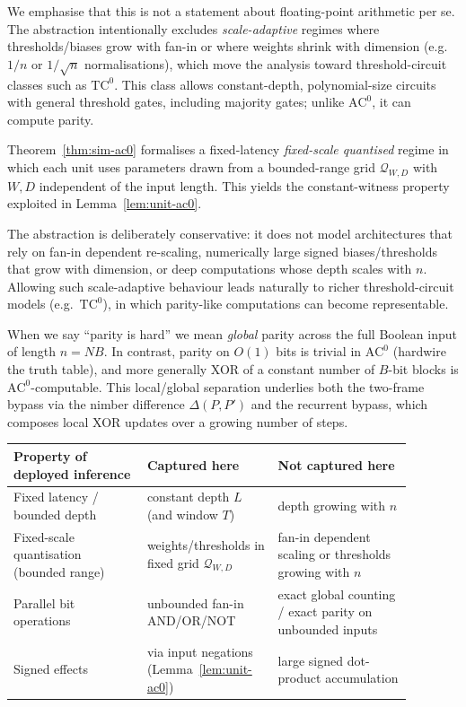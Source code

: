 \documentclass[twoside,11pt]{article}
\newcommand{\AC}{\mathrm{AC}}
\newcommand{\TC}{\mathrm{TC}}
\newcommand{\Qset}{\mathcal{Q}}
\numberwithin{theorem}{section}
\numberwithin{equation}{section}
\begin{document}
We emphasise that this is not a statement about floating-point arithmetic per se.
The abstraction intentionally excludes \emph{scale-adaptive} regimes where thresholds/biases grow with fan-in or where weights shrink with dimension (e.g.\ $1/n$ or $1/\sqrt{n}$ normalisations), which move the analysis toward threshold-circuit classes such as $\TC^0$. This class allows constant-depth, polynomial-size circuits with general threshold gates, including majority gates; unlike $\AC^0$, it can compute parity.
\begin{remark}[Scope of the $\AC^0$ abstraction]
\label{rem:ac0-scope}
Theorem~\ref{thm:sim-ac0} formalises a fixed-latency \emph{fixed-scale quantised} regime in which each unit uses parameters drawn from a bounded-range grid $\Qset_{W,D}$ with $W,D$ independent of the input length.
This yields the constant-witness property exploited in Lemma~\ref{lem:unit-ac0}.

The abstraction is deliberately conservative: it does not model architectures that rely on fan-in dependent re-scaling, numerically large signed biases/thresholds that grow with dimension, or deep computations whose depth scales with $n$.
Allowing such scale-adaptive behaviour leads naturally to richer threshold-circuit models (e.g.\ $\TC^0$), in which parity-like computations can become representable.
\end{remark}

\begin{remark}
\label{rem:local-vs-global-parity}
When we say ``parity is hard'' we mean \emph{global} parity across the full Boolean input of length $n=NB$.
In contrast, parity on $O(1)$ bits is trivial in $\AC^0$ (hardwire the truth table), and more generally XOR of a constant number of $B$-bit blocks is $\AC^0$-computable.
This local/global separation underlies both the two-frame bypass via the nimber difference $\Delta(P,P')$ and the recurrent bypass, which composes local XOR updates over a growing number of steps.
\end{remark}

\begin{center}
\begin{tabular}{|>{\raggedright\arraybackslash}p{0.30\linewidth}|>{\raggedright\arraybackslash}p{0.28\linewidth}|>{\raggedright\arraybackslash}p{0.30\linewidth}|}
\hline
\textbf{Property of deployed inference} & \textbf{Captured here} & \textbf{Not captured here} \\
\hline
Fixed latency / bounded depth & constant depth $L$ (and window $T$) & depth growing with $n$ \\
\hline
Fixed-scale quantisation (bounded range) & weights/thresholds in fixed grid $\Qset_{W,D}$ & fan-in dependent scaling or thresholds growing with $n$ \\
\hline
Parallel bit operations & unbounded fan-in AND/OR/NOT & exact global counting / exact parity on unbounded inputs \\
\hline
Signed effects & via input negations (Lemma~\ref{lem:unit-ac0}) & large signed dot-product accumulation \\
\hline
\end{tabular}
\end{center}
\end{document}
